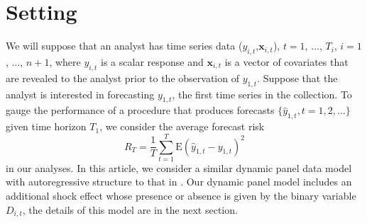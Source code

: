 \documentclass[11pt]{article}
\newcommand{\x}{\textbf{x}}
\def\E#1{\mathrm{E}(#1)} %
\theoremstyle{definition}
\begin{document}



\section{Setting}
\label{setting}



We will suppose that an analyst has time series data ($y_{i,t}$,$\x_{i,t}$), 
$t = 1$, $\ldots$, $T_i$, $i = 1$, $\ldots$, $n+1$, where $y_{i,t}$ is a 
scalar response and $\x_{i,t}$ is a vector of covariates that are revealed to 
the analyst prior to the observation of $y_{1,t}$.  Suppose that the analyst 
is interested in forecasting $y_{1,t}$, the first time series in the 
collection.
To gauge the performance of a procedure that produces forecasts 
$\{\hat y_{1,t}, t= 1,2,\ldots\}$ given time horizon $T_1$, we consider the 
average forecast risk
$$
  R_T = \frac{1}{T}\sum_{t=1}^T\E{\hat y_{1,t} - y_{1,t}}^2
$$
in our analyses. In this article, we consider a similar dynamic panel data 
model with autoregressive structure to that in \citet{blundell1998initial}. 
Our dynamic panel model includes an additional shock effect whose presence 
or absence is given by the binary variable $D_{i,t}$, the details of this model 
are in the next section.
\end{document}
